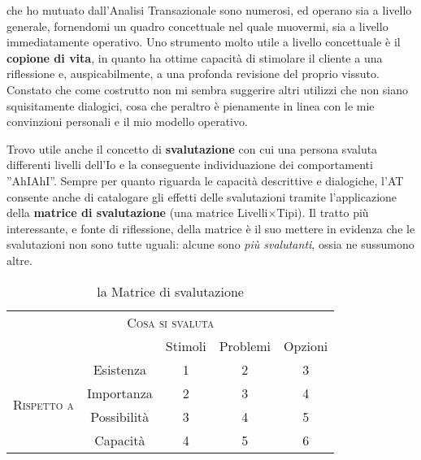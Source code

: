  che ho mutuato dall'Analisi Transazionale sono numerosi, ed operano sia a livello generale, fornendomi un quadro concettuale nel quale muovermi, sia a livello immediatamente operativo. Uno strumento molto utile a livello concettuale è il \textbf{copione di vita}, in quanto ha ottime capacità di stimolare il cliente a una riflessione e, auspicabilmente, a una profonda revisione del proprio vissuto. Constato che come costrutto non mi sembra suggerire altri utilizzi che non siano squisitamente dialogici, cosa che peraltro è pienamente in linea con le mie convinzioni personali e il mio modello operativo.

Trovo utile anche il concetto di \textbf{svalutazione}%
%
 con cui una persona svaluta differenti livelli dell'Io e la conseguente individuazione dei comportamenti ''AhIAhI''.
Sempre per quanto riguarda le capacità descrittive e dialogiche, l'AT consente anche di catalogare gli effetti delle svalutazioni tramite l'applicazione della \textbf{matrice di svalutazione} (una matrice Livelli$\times$Tipi). Il tratto più interessante, e fonte di riflessione, della matrice è il suo mettere in evidenza che le svalutazioni non sono tutte uguali: alcune sono \emph{più svalutanti}, ossia ne sussumono altre.

\begin{table}[ht]
  \centering
  \begin{tabular}{c c c c c}
        \toprule
	\multicolumn{5}{c}{\textsc{Cosa si svaluta}}\\ 
    &	& Stimoli & Problemi & Opzioni \\
    \midrule
	\multirow{4}{*}{\begin{sideways}\textsc{Rispetto a}\end{sideways}}    
    &	Esistenza	& 1 & 2 & 3\\
    &	Importanza	& 2 & 3 & 4\\
    &	Possibilità	& 3 & 4 & 5\\
    &	Capacità	& 4 & 5 & 6\\
	\bottomrule
  \end{tabular}
  \caption{la Matrice di svalutazione}
  \label{tab:svalutazione}
\end{table}


